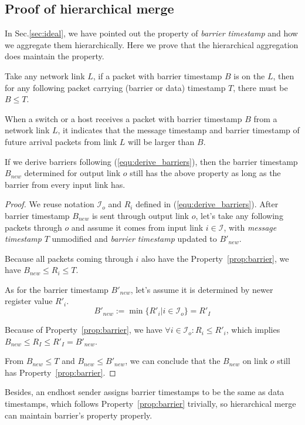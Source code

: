 \subsection{Proof of hierarchical merge}
\label{appx:hierarchical_merge}
In Sec.\ref{sec:ideal}, we have pointed out the property of \textit{barrier timestamp} and how we aggregate them hierarchically.
Here we prove that the hierarchical aggregation does maintain the property.
\begin{property}\label{prop:barrier}
	Take any network link $L$, if a packet with barrier timestamp $B$ is on the $L$, then for any following packet carrying (barrier or data) timestamp $T$, there must be $B \le T$.
	
	When a switch or a host receives a packet with barrier timestamp $B$ from a network link $L$, it indicates that the message timestamp and barrier timestamp of future arrival packets from link $L$ will be larger than $B$.
\end{property}
\begin{theorem}
	If we derive barriers following (\ref{equ:derive_barriers}), then the barrier timestamp $B_{new}$ determined for output link $o$ still has the above property as long as the barrier from every input link has.
\end{theorem}
\begin{proof}
	We reuse notation $\mathcal{I}_o$ and $R_i$ defined in (\ref{equ:derive_barriers}).
	After barrier timestamp $B_{new}$ is sent through output link $o$, let's take  any following packets through $o$ and assume it comes from input link $i \in \mathcal{I}$, with \textit{message timestamp} $T$ unmodified and \textit{barrier timestamp} updated to $B'_{new}$.
	
	Because all packets coming through $i$ also have the Property~\ref{prop:barrier}, we have $B_{new} \le R_i \le T$.
	
	As for the barrier timestamp $B'_{new}$, let's assume it is determined by newer register value $R'_i$.
	$$B'_{new} := \min\{R'_i|i \in \mathcal{I}_o\} = R'_I$$
	
	Because of Property~\ref{prop:barrier}, we have $\forall i \in \mathcal{I}_o:R_i \le R'_i$, which implies $B_{new} \le R_I \le R'_I = B'_{new}$.

	From $B_{new} \le T$ and $B_{new} \le B'_{new}$, we can conclude that the $B_{new}$ on link $o$ still has Property~\ref{prop:barrier}.
\end{proof}

Besides, an endhost sender assigns barrier timestamps to be the same as data timestamps, which follows Property~\ref{prop:barrier} trivially, so hierarchical merge can maintain barrier's property properly.
